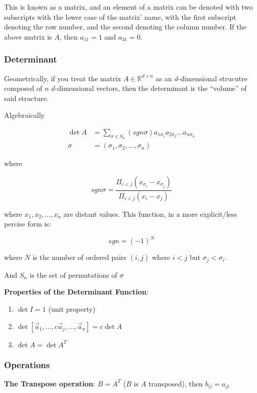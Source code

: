 \documentclass[11 pt, twoside]{article}
\begin{document}
This is known as a matrix, and an element of a matrix can be denoted with two
subscripts with the lower case of the matrix' name, with the first subscript denoting the row number, and the second denoting the
column number. If the above matrix is $A$, then $a_{11} = 1$ and $a_{31} = 0$.

\subsubsection{Determinant}

Geometrically, if you treat the matrix $A \in \mathbb{R}^{d \times n}$ as an
$d$-dimensional strucutre composed of $n$ $d$-dimensional vectors, then the
determinant is the ``volume'' of said structure.

Algebraically

\begin{align*}
\det A &= \sum_{\sigma \in S_n} (sgn  \sigma) a_{1 \sigma_1} a_{2 \sigma_2}
\dots a_{n\sigma_n}\\
\sigma &= (\sigma_1, \sigma_2, \dots, \sigma_n)
\end{align*}

where 

$$sgn  \sigma = \frac{\Pi_{i < j} (x_{\sigma_i} - x_{\sigma_j})}{\Pi_{i
< j} (x_i - x_j)}$$

where $x_1, x_2, \dots, x_n$ are distant values. This function, in a more
explicit/less percise form is:

$$sgn = (-1)^N$$

where $N$ is the number of ordered pairs $(i, j)$ where $i < j$ but $\sigma_j <
\sigma_i$.

And $S_n$ is the set of permutations of $\sigma$

\textbf{Properties of the Determinant Function}:
\begin{enumerate}
\item $\det I = 1$ (unit property)
\item $\det[\vec{a}_1, \dots, c\vec{a}_j, \dots, \vec{a}_n] = c \det A$
\item $\det A = \det A^T$
\end{enumerate}


\subsubsection{Operations}

\textbf{The Transpose operation}: $B = A^T$ ($B$ is $A$ transposed),
then $b_{ij} = a_{ji}$
\end{document}
